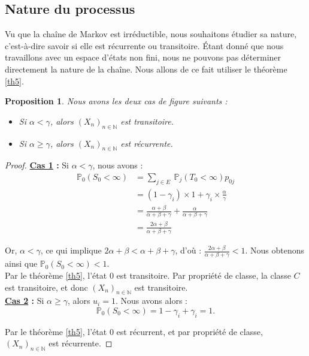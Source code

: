 \documentclass[12pt,a4paper]{report}
\newtheorem{prop}[thm]{Proposition}
\theoremstyle{remark}
\begin{document}
\subsection{Nature du processus}
\vspace{0.6cm}

Vu que la chaîne de Markov est irréductible, nous souhaitons étudier sa nature, c'est-à-dire savoir si elle est récurrente ou transitoire. Étant donné que nous travaillons avec un espace d'états non fini, nous ne pouvons pas déterminer directement la nature de la chaîne. Nous allons de ce fait utiliser le théorème \ref{th5}.

\begin{prop}
Nous avons les deux cas de figure suivants :
\begin{itemize}
    \item Si $\alpha < \gamma$, alors $(X_n)_{n \in \mathbb{N}}$ est transitoire.
    \item Si $\alpha \geqslant \gamma$, alors $(X_n)_{n \in \mathbb{N}}$ est récurrente.
\end{itemize}
\end{prop}
\begin{proof}
\textbf{\underline{Cas 1} :} Si $\alpha<\gamma$, nous avons : 
\begin{align*}
\mathbb{P}_0(S_0 < \infty) &= \sum_{j\in E}{\ \mathbb{P}_j(T_0 < \infty)p_{0j}} \\
&= (1-\gamma_{i}) \times 1 + \gamma_{i} \times \frac{\alpha}{\gamma} \\
&=\frac{\alpha+\beta}{\alpha+\beta+\gamma}+\frac{\alpha}{\alpha+\beta+\gamma} \\
&= \frac{2\alpha+\beta}{\alpha+\beta+\gamma}
\end{align*}

Or, $\alpha < \gamma$, ce qui implique $2\alpha + \beta < \alpha + \beta + \gamma$, d'où : $\frac{2\alpha+\beta}{\alpha+\beta+\gamma} < 1$. Nous obtenons ainsi que $\mathbb{P}_0(S_0 < \infty) < 1$. \\
Par le théorème \ref{th5}, l'état $0$ est transitoire. Par propriété  de classe, la classe $C$ est transitoire, et donc $(X_n)_{n \in \mathbb{N}}$ est transitoire.\\

\textbf{\underline{Cas 2} :} Si $\alpha \geqslant \gamma$, alors $u_i=1$. Nous avons alors :
$$\mathbb{P}_0(S_0 < \infty)=
 1-\gamma_i+\gamma_i=1.$$

Par le théorème \ref{th5}, l'état $0$ est récurrent, et par propriété de classe, $(X_n)_{n \in \mathbb{N}}$ est récurrente.
\end{proof}
\end{document}
